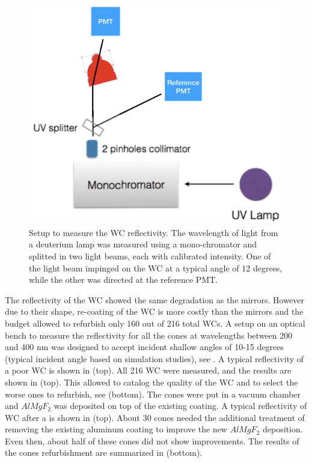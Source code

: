 \begin{figure}
	\centering
	\includegraphics[width=0.95\columnwidth,keepaspectratio]{img/wcSetup.png}
	\caption{Setup to measure the WC reflectivity. The wavelength of light from a deuterium lamp was measured using a mono-chromator and splitted in two
            light beams, each with calibrated intensity. One of the light beam impinged on the WC at a typical angle of 12 degrees,
            while the other was directed at the reference PMT. }
	\label{fig:wcSetup}
\end{figure}

The reflectivity of the WC showed the same degradation as the mirrors. However due to their shape, re-coating of the WC is more costly than the mirrors and the budget allowed
to refurbish only 160 out of 216 total WCs.
A setup on an optical bench to measure the reflectivity for all the cones at wavelengths between 200 and 400 nm was designed to accept incident
shallow angles of 10-15 degrees (typical incident angle based on simulation studies), see . A typical reflectivity of a poor WC is shown in  (top).
All 216 WC were measured, and the results are shown in  (top). This allowed to catalog the quality of the WC and to select the worse ones to refurbish,
see  (bottom).
The cones were put in a vacuum chamber and $AlMgF_2$ was deposited on top of the existing coating. A typical reflectivity of WC after a is shown in  (top).
About 30 cones needed the additional treatment of removing the existing aluminum coating to improve the new $AlMgF_2$ deposition. Even then, about half of these cones did not show improvements.
The results of the cones refurbishment are summarized in  (bottom).


